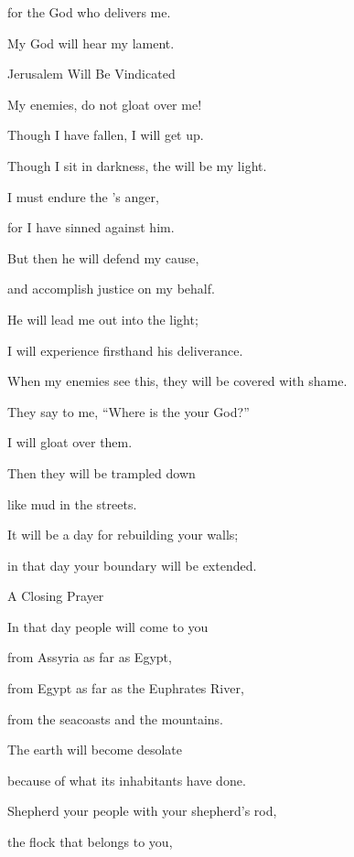 {for the God
who delivers
me.
\par }{\Q My God
will hear my lament.
\par }{\SH Jerusalem Will Be Vindicated
\par }{\Q {}My enemies,
do not
gloat
over me!
\par }{\Q Though
I have fallen,
I will get
up.
\par }{\Q Though
I sit
in darkness,
the {}
will be my light.
\par }{\Q {}I must endure
the
{}’s
anger,
\par }{\Q for
I have sinned
against him.
\par }{\Q But then he will defend
my cause,
\par }{\Q and accomplish
justice
on my behalf.
\par }{\Q He will lead me out
into the light;
\par }{\Q I
will experience firsthand
his deliverance.
\par }{\Q {}When my enemies
see
this, they will be covered
with shame.
\par }{\Q They say
to me,
“Where
is the
{}
your God?”
\par }{\Q I will gloat
over them.

\par }{\Q Then they will be
trampled down
\par }{\Q like mud
in the streets.
\par }{\Q {}It
will be a day
for rebuilding
your walls;
\par }{\Q in that day
your boundary will be extended.
\par }{\SH A Closing Prayer
\par }{\Q {}In that day
people
will come
to you

\par }{\Q from
Assyria
as far as
Egypt,
\par }{\Q from
Egypt
as far as the
Euphrates River,
\par }{\Q from the seacoasts
and the mountains.
\par }{\Q {}The earth
will become
desolate
\par }{\Q because
of what its inhabitants
have done.
\par }{\Q {}Shepherd
your people
with your shepherd’s rod,
\par }{\Q the flock
that belongs
to you,

}
